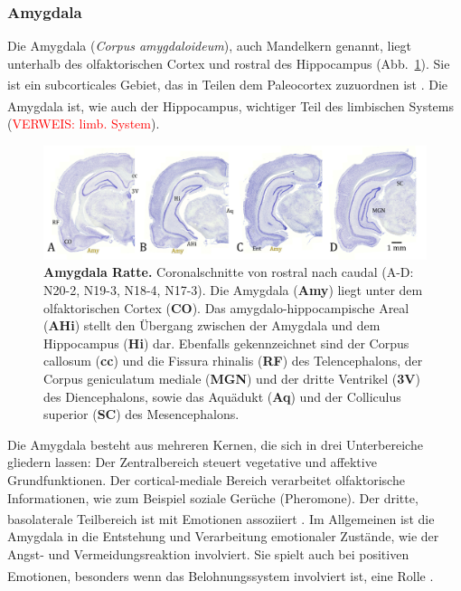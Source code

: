 \documentclass[12pt,a4paper,pdftex]{article}
\begin{document}
\subsubsection{Amygdala}
\label{subsubsec:Amygdala} 

Die Amygdala (\textit{Corpus amygdaloideum}), auch Mandelkern genannt, liegt unterhalb des olfaktorischen Cortex und rostral des Hippocampus (Abb.~\ref{fig:amygdala_ratte}). Sie ist ein subcorticales Gebiet, das in Teilen dem Paleocortex zuzuordnen ist \textsuperscript{\cite[9]{trepel2011neuroanatomie}}. Die Amygdala ist, wie auch der Hippocampus, wichtiger Teil des limbischen Systems \textsuperscript{\cite[15]{kandel2013principles}} (\textcolor{red}{VERWEIS: limb. System}). 

\begin{figure}[H]
    \centering
    \includegraphics[width=\textwidth]{pictures/Bilder_Jule/Ratte/amygdala.png}
    \caption[Amygdala Ratte]{\textbf{Amygdala Ratte.} Coronalschnitte von rostral nach caudal (A-D: N20-2, N19-3, N18-4, N17-3). Die Amygdala (\textbf{Amy}) liegt unter dem olfaktorischen Cortex (\textbf{CO}). Das amygdalo-hippocampische Areal (\textbf{AHi}) stellt den Übergang zwischen der Amygdala und dem Hippocampus (\textbf{Hi}) dar. Ebenfalls gekennzeichnet sind der Corpus callosum (\textbf{cc}) und die Fissura rhinalis (\textbf{RF}) des Telencephalons, der Corpus geniculatum mediale (\textbf{MGN}) und der dritte Ventrikel (\textbf{3V}) des Diencephalons, sowie das Aquädukt (\textbf{Aq}) und der Colliculus superior (\textbf{SC}) des Mesencephalons.}
    \label{fig:amygdala_ratte}
\end{figure}{}

\noindent Die Amygdala besteht aus mehreren Kernen, die sich in drei Unterbereiche gliedern lassen: Der Zentralbereich steuert vegetative und affektive Grundfunktionen. Der cortical-mediale Bereich verarbeitet olfaktorische Informationen, wie zum Beispiel soziale Gerüche (Pheromone). Der dritte, basolaterale Teilbereich ist mit Emotionen assoziiert \textsuperscript{\cite[6]{storch2012lehrbuchzoo}}. Im Allgemeinen ist die Amygdala in die Entstehung und Verarbeitung emotionaler Zustände, wie der Angst- und   Vermeidungsreaktion involviert. Sie spielt auch bei positiven Emotionen, besonders wenn das Belohnungssystem involviert ist, eine Rolle \textsuperscript{\cite[48]{kandel2013principles}}.\\
\end{document}
